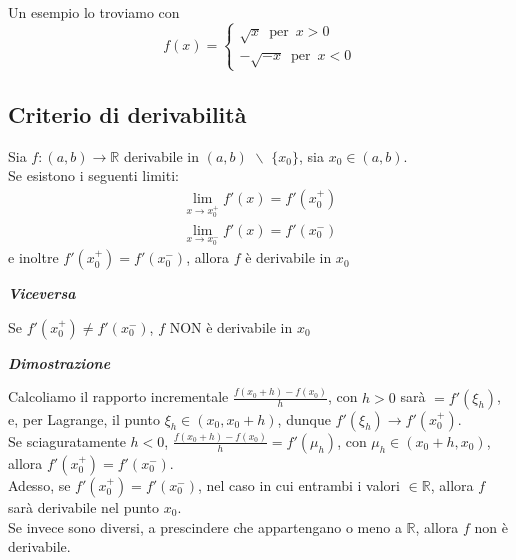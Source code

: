 \documentclass{article}
\theoremstyle{definition}
\newcommand{\R}{\mathbb{R}}
\begin{document}
Un esempio lo troviamo con
\begin{equation*}
    f(x)=\begin{cases}
        \sqrt{x} \,\,\, \mbox{per} \,\,\, x>0 \\
        -\sqrt{-x} \,\,\, \mbox{per} \,\,\, x<0
    \end{cases}
\end{equation*}

\subsection{Criterio di derivabilità}
Sia $f:(a,b) \to \R$ derivabile in $(a,b) \,\, \backslash \,\, \{x_0\}$, sia $x_0 \in (a,b)$.
\\
Se esistono i seguenti limiti:
\begin{align*}
    \lim_{x \to x_0^+}f'(x)=f'(x_0^+) \\
    \lim_{x \to x_0^-}f'(x)=f'(x_0^-)
\end{align*}
e inoltre $f'(x_0^+)=f'(x_0^-)$, allora $f$ è derivabile in $x_0$
\begin{center}
    \textbf{\textit{Viceversa}}
\end{center}
Se $f'(x_0^+) \neq f'(x_0^-)$, $f$ NON è derivabile in $x_0$

\begin{center}
    \textbf{\textit{Dimostrazione}}
\end{center}
Calcoliamo il rapporto incrementale $\frac{f(x_0+h)-f(x_0)}{h}$, con $h>0$ sarà $=f'(\xi_h)$, e, per Lagrange, il punto $\xi_h \in (x_0, x_0+h)$, dunque $f'(\xi_h) \to f'(x_0^+)$.
\\
Se sciaguratamente $h<0$, $\frac{f(x_0+h)-f(x_0)}{h}=f'(\mu_h)$, con $\mu_h \in (x_0+h, x_0)$, allora $f'(x_0^+)=f'(x_0^-)$.
\\
Adesso, se $f'(x_0^+)=f'(x_0^-)$, nel caso in cui entrambi i valori $\in \R$, allora $f$ sarà derivabile nel punto $x_0$.
\\
Se invece sono diversi, a prescindere che appartengano o meno a $\R$, allora $f$ non è derivabile.
\end{document}
